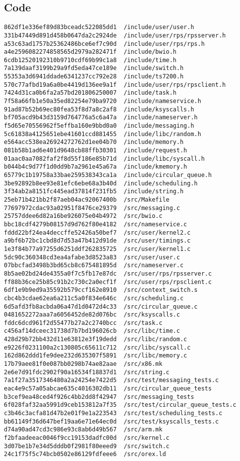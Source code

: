 \documentclass{article}
\begin{document}
\subsection{Code}
\begin{verbatim}
862df1e336ef89d83bceadc522085dd1  /include/user/user.h
331b47449d891d458b0647da2c2924de  /include/user/rps/rpsserver.h
a53c63ad1757b25362486bce6ef7c90d  /include/user/rps/rps.h
a4e2596082274858565d2979a282471f  /include/bwio.h
6cdb12520192310b9710cdf69b99c1a8  /include/time.h
7a139daaf3199b29a9fd5eda47ce189e  /include/switch.h
55353a3d6941ddade6341237cc792e28  /include/ts7200.h
570c77afbd19a6a0be4419d136ee9a1f  /include/user/rps/rpsclient.h
7424d31ca0b6fa2a57bd201806250007  /include/task.h
7f58a66fb1e50a35ed82254e79ba9720  /include/nameservice.h
91ad87b52b69ec80fea53f8d7a8c2af8  /include/ksyscalls.h
bf705acd9b43d3159d764776a5c6a47a  /include/nameserver.h
f5d65e70556962f5effba160e9bbd0a0  /include/messaging.h
5c61838a4125651ebe41601ccd881455  /include/libc/random.h
e564acc538ea26924272762d1ee04b70  /include/memory.h
081b58b1ad6e401d9648cb88ffb30301  /include/request.h
01aac0aa7082faf2f8d55f186e85b71d  /include/libc/syscall.h
b044b4c9d77f1d0dd9b7a2961e45a67a  /include/kmemory.h
65779c1b19758a33bae259538343ca1a  /include/circular_queue.h
3be92892b8ee93e81efc6ebe68a3b40d  /include/scheduling.h
3f34ab2a8151fc445ead37814f231fb5  /include/string.h
25eb71b421bb2f87aeb04ac92067400b  /src/Makefile
77697972cdac93a02951f8476ce29379  /src/messaging.c
25757ddee6d82a16be926075e04b4972  /src/bwio.c
bbc18cdf4279b08157d9d762f80e4182  /src/nameservice.c
fddd22bf24ea4deccffe52426a50bef7  /src/user/kernel2.c
a9bf6b72bc1cbd8d7d53a47b412d91de  /src/user/timings.c
1e3f84b77a97255d6251ddf262835725  /src/user/kernel1.c
5dc90c360348cd3ea4afabe3d8523a83  /src/user/user.c
07bbcfad3498b3bd65cb8c675481895d  /src/nameserver.c
8b5ae02bd24de4355a0f7c5fb17e87dc  /src/user/rps/rpsserver.c
ff88b36ce25b85c91b2c730c2a0ecf1f  /src/user/rps/rpsclient.c
6df1e9b9ed9a35592b579ccf162e8910  /src/context_switch.s
cbc4b3cdae62ea6a211c5a0f834e646c  /src/scheduling.c
6d5afd3fb8acbda06a47d1d0472d4c33  /src/circular_queue.c
0481652272aaa7a6056452de82d076bc  /src/ksyscalls.c
fddc6dcd961f2d55477b27a2c2740bcc  /src/task.c
c456af14dceec31738d7b7bd196026cb  /src/libc/time.c
428d29b72bb432d11e63812e3f19dedd  /src/libc/random.c
e9226f0231100a2c130805c65611c712  /src/libc/syscall.c
162d862ddd1fe9dee232d635307f5891  /src/libc/memory.c
17b79aee81f0e087bb0298b74ae82aae  /src/x86.mk
2e6e7d91fdc2902f90a16534f18837d1  /src/string.c
7a1f27a3517346480a2a24254e7422d5  /src/test/messaging_tests.c
eac4e9c57a05abcae635c4016302db11  /src/circular_queue_tests
b3cef9ea48ced4f926c4bb2dd8f42947  /src/messaging_tests
6f028faf32aa5991d9ceb153812a7f35  /src/test/circular_queue_tests.c
c3b46c3acfa81d47b2e01f9e1a223543  /src/test/scheduling_tests.c
bb61149f36d647bef19aa6e71e64ec0d  /src/test/ksyscalls_tests.c
d74a90ad47cd3c986e93c8ab6d49b567  /src/arm.mk
f2bfaadeeac0046f9cc19153dadfc00d  /src/kernel.c
3d07be1b7e34d5dddb0f2981f80eeed9  /src/switch.c
24c1f75f5c74bcb0502e86129fdfeee6  /src/orex.ld
\end{verbatim}
\end{document}

